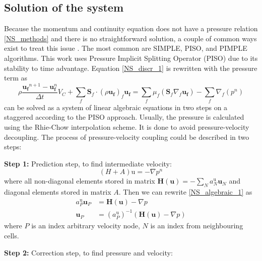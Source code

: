 \subsection{Solution of the system}\label{p-v-coupling}
Because the momentum and continuity equation does not have a pressure relation \ref{NS_methods} and there is no straightforward solution, a couple of common ways exist to treat this issue \cite{ferziger2002cfd}. The most common are SIMPLE, PISO, and PIMPLE algorithms. This work uses Pressure Implicit Splitting Operator (PISO) \cite{ferziger2002cfd} due to its stability to time advantage. Equation \ref{NS_discr_1} is rewritten with the pressure term as
\begin{equation} \label{NS_algebraic}
\rho \frac{\mathbf{u}_{\mathbf{f}}{ }^{n+1}-\mathbf{u}_{\mathbf{f}}^{n}}{\Delta t} V_C+\sum_f \mathbf{S}_f \cdot\left(\rho \mathbf{u}_{\mathbf{f}}\right)_f \mathbf{u}_{\mathbf{f}}=\sum_f \mu_f\left(\mathbf{S}_f \nabla_f \mathbf{u}_{\mathbf{f}}\right)-\sum_f \nabla_f\left(p^n\right)
\end{equation}
can be solved as a system of linear algebraic equations in two steps on a staggered according to the PISO approach. Usually, the pressure is calculated using the Rhie-Chow\cite{rhie} interpolation scheme. It is done to avoid pressure-velocity decoupling. The process of pressure-velocity coupling could be described in two steps:

\textbf{Step 1:} Prediction step, to find intermediate velocity:
\begin{equation}\label{NS_algebraic_1}
    (H+A)\mathrm{u} = -\nabla p^n
\end{equation}
where all non-diagonal elements stored in matrix $\mathbf{H}(\mathbf{u})= -\sum_{N} a_{N}^{\mathrm{u}} \mathbf{u}_{N}$ and diagonal elements stored in matrix $A$. Then we can rewrite \ref{NS_algebraic_1} as
\begin{equation}\label{NS_algebraic_2_}
    \begin{aligned}
a_{P}^{\mathrm{u}} \mathbf{u}_{P} &= \mathbf{H}(\mathbf{u})-\nabla p \\
\mathbf{u}_{P} &= \left(a_{P}^{\mathrm{u}}\right)^{-1}(\mathbf{H}(\mathbf{u})-\nabla p)
\end{aligned}
\end{equation}
where $P$ is an index arbitrary velocity node, $N$ is an index from neighbouring cells.

\textbf{Step 2:} Correction step, to find pressure and velocity:

